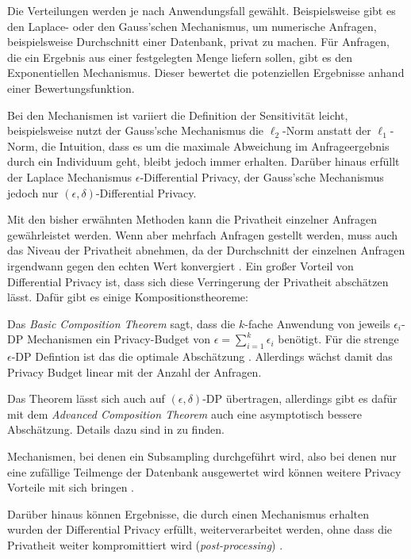 Die Verteilungen werden je nach Anwendungsfall gewählt. Beispielsweise gibt es den Laplace- oder den Gauss'schen Mechanismus, um numerische Anfragen, beispielsweise Durchschnitt einer Datenbank, privat zu machen. Für Anfragen, die ein Ergebnis aus einer festgelegten Menge liefern sollen, gibt es den Exponentiellen Mechanismus. Dieser bewertet die potenziellen Ergebnisse anhand einer Bewertungsfunktion.\cite{mcsherry:2007}

Bei den Mechanismen ist variiert die Definition der Sensitivität leicht, beispielsweise nutzt der Gauss'sche Mechanismus die $\ell_2$-Norm anstatt der $\ell_1$-Norm, die Intuition, dass es um die maximale Abweichung im Anfrageergebnis durch ein Individuum geht, bleibt jedoch immer erhalten. Darüber hinaus erfüllt der Laplace Mechanismus $\epsilon$-Differential Privacy, der Gauss'sche Mechanismus jedoch nur $(\epsilon, \delta)$-Differential Privacy.\cite[p.261ff]{dwork:2014}

Mit den bisher erwähnten Methoden kann die Privatheit einzelner Anfragen gewährleistet werden. Wenn aber mehrfach Anfragen gestellt werden, muss auch das Niveau der Privatheit abnehmen, da der Durchschnitt der einzelnen Anfragen irgendwann gegen den echten Wert konvergiert \cite[p.42]{dwork:2014}. Ein großer Vorteil von Differential Privacy ist, dass sich diese Verringerung der Privatheit abschätzen lässt. Dafür gibt es einige Kompositionstheoreme:

Das \textit{Basic Composition Theorem} sagt, dass die $k$-fache Anwendung von jeweils $\epsilon_i$-DP Mechanismen ein Privacy-Budget von $\epsilon = \sum_{i=1}^{k} \epsilon_i$ benötigt. Für die strenge $\epsilon$-DP Defintion ist das die optimale Abschätzung \cite{steinke:2022}. Allerdings wächst damit das Privacy Budget linear mit der Anzahl der Anfragen. 

Das Theorem lässt sich auch auf $(\epsilon, \delta)$-DP übertragen, allerdings gibt es dafür mit dem \textit{Advanced Composition Theorem} auch eine asymptotisch bessere Abschätzung. Details dazu sind in \textcite{dwork:2010, steinke:2022} zu finden.

Mechanismen, bei denen ein Subsampling durchgeführt wird, also bei denen nur eine zufällige Teilmenge der Datenbank ausgewertet wird können weitere Privacy Vorteile mit sich bringen \cite{mironov:2019, steinke:2022}.

Darüber hinaus können Ergebnisse, die durch einen Mechanismus erhalten wurden der Differential Privacy erfüllt, weiterverarbeitet werden, ohne dass die Privatheit weiter kompromittiert wird (\textit{post-processing}) \cite{dwork:2014}.

